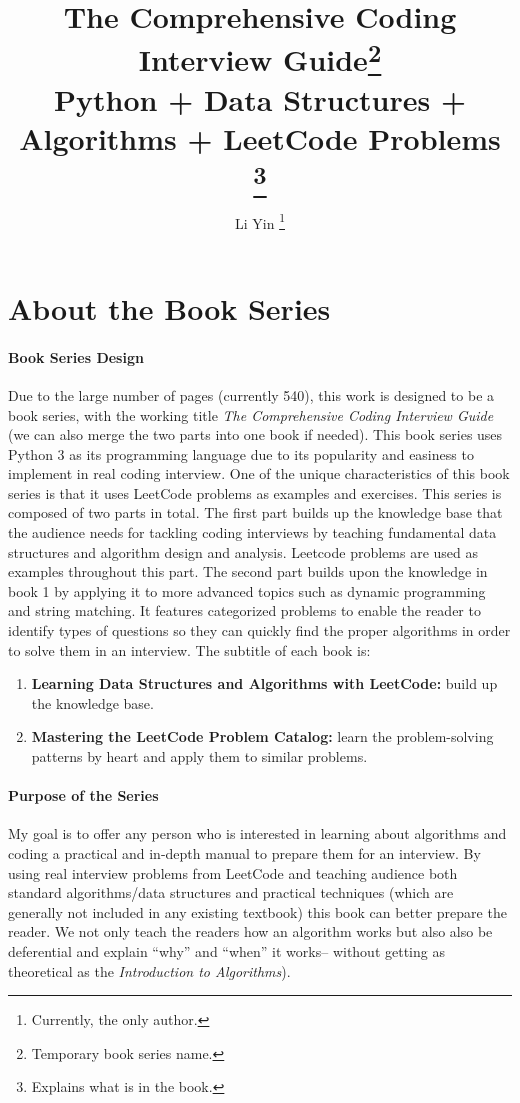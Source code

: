 \documentclass[12pt]{article}
\title{The Comprehensive Coding
Interview Guide\footnote{Temporary book series name.}\\ \normalsize  Python + Data Structures + Algorithms + LeetCode Problems \footnote{Explains what is in the book.}}
\author{Li Yin \footnote{Currently, the only author.}}
\begin{document}
\maketitle

\tableofcontents
\section{About the Book Series}
\paragraph{Book Series Design} Due to the large number of pages (currently 540), this work is designed to be a book series, with the working title \textit{The Comprehensive Coding Interview Guide} (we can also merge the two parts into one book if needed). This book series uses Python 3 as its programming language due to its popularity and easiness to implement in real coding interview. One of the unique characteristics of this book series is that it uses LeetCode problems as examples and exercises. This series is composed of two parts in total. The first part builds up the knowledge base that the audience needs for tackling coding interviews by teaching fundamental data structures and algorithm design and analysis. Leetcode problems are used as examples throughout this part.  The second part builds upon the knowledge in book 1 by applying it to more advanced topics such as dynamic programming and string matching. It features categorized problems to enable the reader to identify types of questions so they can quickly find the proper algorithms in order to solve them in an interview. The subtitle of each book is:
\begin{enumerate}
    \item \textbf{Learning Data Structures and Algorithms with LeetCode:} build up the knowledge base.
    \item \textbf{Mastering the LeetCode Problem Catalog:} learn the problem-solving patterns by heart and apply them to similar problems. 
\end{enumerate}

\paragraph{Purpose of the Series} My goal is to offer any person who is interested in learning about algorithms and coding a practical and in-depth manual to prepare them for an interview. By using real interview problems from LeetCode and teaching audience both standard algorithms/data structures and practical techniques (which are generally not included in any existing textbook)  this book can better prepare the reader. We not only teach the readers how an algorithm works but also also be deferential and explain ``why'' and ``when'' it works-- without getting as theoretical as the \textit{Introduction to Algorithms}).
\end{document}
